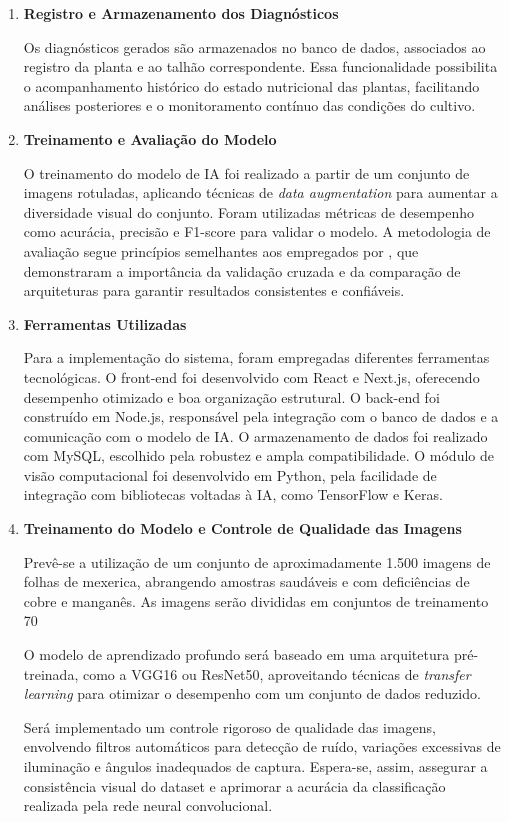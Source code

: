 \begin{enumerate}
\item \textbf{Registro e Armazenamento dos Diagnósticos}

Os diagnósticos gerados são armazenados no banco de dados, associados ao registro da planta e ao talhão correspondente. Essa funcionalidade possibilita o acompanhamento histórico do estado nutricional das plantas, facilitando análises posteriores e o monitoramento contínuo das condições do cultivo.

\item \textbf{Treinamento e Avaliação do Modelo}

O treinamento do modelo de IA foi realizado a partir de um conjunto de imagens rotuladas, aplicando técnicas de \textit{data augmentation} para aumentar a diversidade visual do conjunto. Foram utilizadas métricas de desempenho como acurácia, precisão e F1-score para validar o modelo. A metodologia de avaliação segue princípios semelhantes aos empregados por \textcite{Tran2019}, que demonstraram a importância da validação cruzada e da comparação de arquiteturas para garantir resultados consistentes e confiáveis.

\item \textbf{Ferramentas Utilizadas}

Para a implementação do sistema, foram empregadas diferentes ferramentas tecnológicas. O front-end foi desenvolvido com React e Next.js, oferecendo desempenho otimizado e boa organização estrutural. O back-end foi construído em Node.js, responsável pela integração com o banco de dados e a comunicação com o modelo de IA. O armazenamento de dados foi realizado com MySQL, escolhido pela robustez e ampla compatibilidade. O módulo de visão computacional foi desenvolvido em Python, pela facilidade de integração com bibliotecas voltadas à IA, como TensorFlow e Keras.
\item \textbf{Treinamento do Modelo e Controle de Qualidade das Imagens}

Prevê-se a utilização de um conjunto de aproximadamente 1.500 imagens de folhas de mexerica, abrangendo amostras saudáveis e com deficiências de cobre e manganês. As imagens serão divididas em conjuntos de treinamento 70%

O modelo de aprendizado profundo será baseado em uma arquitetura pré-treinada, como a VGG16 ou ResNet50, aproveitando técnicas de \textit{transfer learning} para otimizar o desempenho com um conjunto de dados reduzido.

Será implementado um controle rigoroso de qualidade das imagens, envolvendo filtros automáticos para detecção de ruído, variações excessivas de iluminação e ângulos inadequados de captura. Espera-se, assim, assegurar a consistência visual do dataset e aprimorar a acurácia da classificação realizada pela rede neural convolucional.
\end{enumerate}